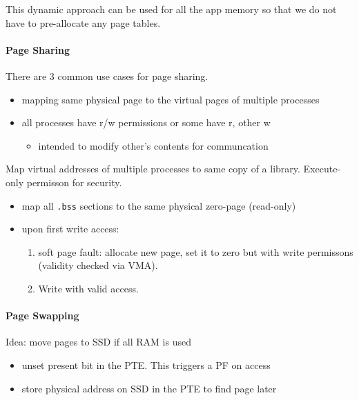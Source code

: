 This dynamic approach can be used for all the app memory so that we do not have to pre-allocate any page tables.

\paragraph{Page Sharing}
There are 3 common use cases for page sharing.

\newpar{}

\begin{itemize}
    \item mapping same physical page to the virtual pages of multiple processes
    \item all processes have r/w permissions or some have r, other w
          \begin{itemize}
              \item intended to modify other's contents for communcation
          \end{itemize}
\end{itemize}

\newpar{}

Map virtual addresses of multiple processes to same copy of a library. Execute-only permisson for security.

\newpar{}

\begin{itemize}
    \item map all \texttt{.bss} sections to the same physical zero-page (read-only)
    \item upon first write access:
          \begin{enumerate}
              \item soft page fault: allocate new page, set it to zero but with write permissons (validity checked via VMA). 
              \item Write with valid access.
          \end{enumerate}
\end{itemize}

\paragraph{Page Swapping}
Idea: move pages to SSD if all RAM is used
\begin{itemize}
    \item unset present bit in the PTE. This triggers a PF on access
    \item store physical address on SSD in the PTE to find page later
\end{itemize}

